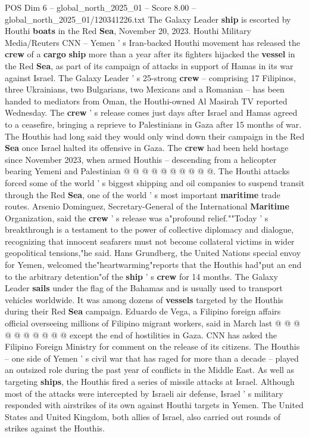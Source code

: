 \begin{textsample}{POS Dim 6 – global\_north\_2025\_01 – Score 8.00 – global\_north\_2025\_01/120341226.txt}  \label{ex:f6_pos_271}
The Galaxy Leader \textbf{ship} is escorted by Houthi \textbf{boats} in the Red \textbf{Sea}, November 20, 2023.
Houthi Military Media/Reuters CNN -- Yemen ' s Iran-backed Houthi movement has released the \textbf{crew} of a \textbf{cargo} \textbf{ship} more than a year after its fighters hijacked the \textbf{vessel} in the Red \textbf{Sea}, as part of its campaign of attacks in support of Hamas in its war against Israel.
The Galaxy Leader ' s 25-strong \textbf{crew} -- comprising 17 Filipinos, three Ukrainians, two Bulgarians, two Mexicans and a Romanian -- has been handed to mediators from Oman, the Houthi-owned Al Masirah TV reported Wednesday.
The \textbf{crew} ' s release comes just days after Israel and Hamas agreed to a ceasefire, bringing a reprieve to Palestinians in Gaza after 15 months of war.
The Houthis had long said they would only wind down their campaign in the Red \textbf{Sea} once Israel halted its offensive in Gaza.
The \textbf{crew} had been held hostage since November 2023, when armed Houthis -- descending from a helicopter bearing Yemeni and Palestinian @ @ @ @ @ @ @ @ @ @.
The Houthi attacks forced some of the world ' s biggest shipping and oil companies to suspend transit through the Red \textbf{Sea}, one of the world ' s most important \textbf{maritime} trade routes.
Arsenio Dominguez, Secretary-General of the International \textbf{Maritime} Organization, said the \textbf{crew} ' s release was a"profound relief.""Today ' s breakthrough is a testament to the power of collective diplomacy and dialogue, recognizing that innocent seafarers must not become collateral victims in wider geopolitical tensions,"he said.
Hans Grundberg, the United Nations special envoy for Yemen, welcomed the"heartwarming"reports that the Houthis had"put an end to the arbitrary detention"of the \textbf{ship} ' s \textbf{crew} for 14 months.
The Galaxy Leader \textbf{sails} under the flag of the Bahamas and is usually used to transport vehicles worldwide.
It was among dozens of \textbf{vessels} targeted by the Houthis during their Red \textbf{Sea} campaign.
Eduardo de Vega, a Filipino foreign affairs official overseeing millions of Filipino migrant workers, said in March last @ @ @ @ @ @ @ @ @ @ except the end of hostilities in Gaza.
CNN has asked the Filipino Foreign Ministry for comment on the release of its citizens.
The Houthis -- one side of Yemen ' s civil war that has raged for more than a decade -- played an outsized role during the past year of conflicts in the Middle East.
As well as targeting \textbf{ships}, the Houthis fired a series of missile attacks at Israel.
Although most of the attacks were intercepted by Israeli air defense, Israel ' s military responded with airstrikes of its own against Houthi targets in Yemen.
The United States and United Kingdom, both allies of Israel, also carried out rounds of strikes against the Houthis.

\end{textsample}
